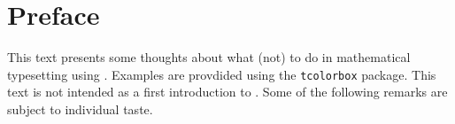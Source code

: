 
\chapter{Preface}

This text presents some thoughts about what (not) to do in mathematical typesetting using .
Examples are provdided using the \texttt{tcolorbox} package.
This text is not intended as a first introduction to .
Some of the following remarks are subject to individual taste.
